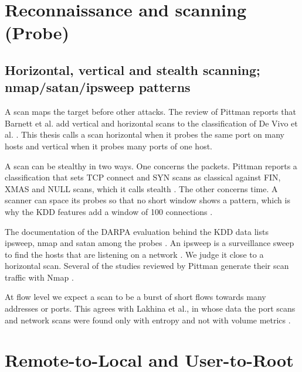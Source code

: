 \section{Reconnaissance and scanning (Probe)}
\label{sec:recon-scanning}

\subsection{Horizontal, vertical and stealth scanning; nmap/\allowbreak satan/\allowbreak ipsweep patterns}
\label{sec:scan-types}

A scan maps the target before other attacks. The review of Pittman reports
that Barnett et al. add vertical and horizontal scans to the classification of
De Vivo et al. \citep{pittman2023portscans}. This thesis calls a scan horizontal when it
probes the same port on many hosts and vertical when it probes many ports of
one host.

A scan can be stealthy in two ways. One concerns the packets. Pittman reports
a classification that sets TCP connect and SYN scans as classical against FIN,
XMAS and NULL scans, which it calls stealth \citep{pittman2023portscans}. The
other concerns time. A scanner can space its probes so that no short window
shows a pattern, which is why the KDD features add a window of 100
connections \citep{tavallaee2009kddcup99}.

The documentation of the DARPA evaluation behind the KDD data lists ipsweep,
nmap and satan among the probes \citep{kddcup1999task,mitll1998attacks}. An
ipsweep is a surveillance sweep to find the hosts that are listening on a
network \citep{mitll1998attacks}. We judge it close to a horizontal scan. Several of the studies reviewed by Pittman generate their scan
traffic with Nmap \citep{pittman2023portscans}.

At flow level we expect a scan to be a burst of short flows towards many
addresses or ports. This agrees with Lakhina et al., in whose data
the port scans and network scans were found only with entropy and not with
volume metrics \citep{lakhina2005mining}.

\section{Remote-to-Local and User-to-Root}
\label{sec:r2l-u2r}

